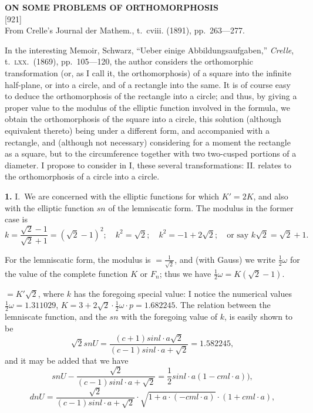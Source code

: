 \documentclass[11pt,a4paper]{article}
\newcommand{\paper}[4]{%
  \newpage
  \begin{center}
    {\large\bfseries #2}\\[0.5em]
    {\small [#1]}\\[0.3em]
    {\small #3}
  \end{center}
  \vspace{0.5em}
}
\begin{document}
\newpage
\paper{921}{ON SOME PROBLEMS OF ORTHOMORPHOSIS}{From Crelle's Journal der Mathem., t.~cviii. (1891), pp.~263---277.}{}

In the interesting Memoir, Schwarz, ``Ueber einige Abbildungsaufgaben,'' \textit{Crelle}, t.\ \textsc{lxx}.\ (1869), pp.\ 105---120, the author considers the orthomorphic transformation (or, as I call it, the orthomorphosis) of a square into the infinite half-plane, or into a circle, and of a rectangle into the same. It is of course easy to deduce the orthomorphosis of the rectangle into a circle; and thus, by giving a proper value to the modulus of the elliptic function involved in the formula, we obtain the orthomorphosis of the square into a circle, this solution (although equivalent thereto) being under a different form, and accompanied with a rectangle, and (although not necessary) considering for a moment the rectangle as a square, but to the circumference together with two two-cusped portions of a diameter. I propose to consider in I, these several transformations: II. relates to the orthomorphosis of a circle into a circle.

\textbf{1.} I.\ We are concerned with the elliptic functions for which $K' = 2K$, and also with the elliptic function $sn$ of the lemniscatic form. The modulus in the former case is
\[
k = \frac{\sqrt{2} - 1}{\sqrt{2} + 1} = (\sqrt{2} - 1)^2; \quad k^2 = \sqrt{2}; \quad k^2 = -1 + 2\sqrt{2}; \quad \text{or say } k\sqrt{2} = \sqrt{2} + 1.
\]

For the lemniscatic form, the modulus is $= \frac{1}{\sqrt{2}}$, and (with Gauss) we write $\frac{1}{2}\omega$ for the value of the complete function $K$ or $F_n$; thus we have $\frac{1}{2}\omega = K(\sqrt{2} - 1)$.

$= K' \sqrt{2}$, where $k$ has the foregoing special value: I notice the numerical values $\frac{1}{2}\omega = 1.311029$, $K = 3 + 2\sqrt{2} \cdot \frac{1}{2}\omega \cdot p = 1.682245$. The relation between the lemniscate function, and the $sn$ with the foregoing value of $k$, is easily shown to be
\[
\sqrt{2} sn U = \frac{(c + 1) sin l \cdot a \sqrt{2}}{(c - 1) sin l \cdot a + \sqrt{2}} = 1.582245,
\]
and it may be added that we have
\[
sn U - \frac{\sqrt{2}}{(c - 1) sin l \cdot a + \sqrt{2}} = \frac{1}{2} sin l \cdot a (1 - cml \cdot a)),
\]
\[
dn U = \frac{\sqrt{2}}{(c - 1) sin l \cdot a + \sqrt{2}} \cdot \sqrt{1 + a \cdot (- cml \cdot a)} \cdot (1 + cml \cdot a),
\]
\end{document}
